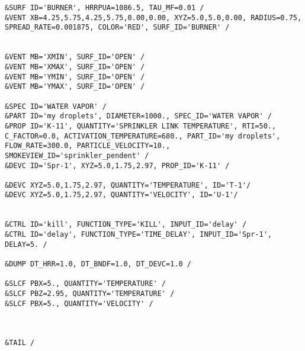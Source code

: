 \begin{lstlisting}[emptylines=0,basicstyle=\tiny]
&SURF ID='BURNER', HRRPUA=1086.5, TAU_MF=0.01 /
&VENT XB=4.25,5.75,4.25,5.75,0.00,0.00, XYZ=5.0,5.0,0.00, RADIUS=0.75, SPREAD_RATE=0.001875, COLOR='RED', SURF_ID='BURNER' /


&VENT MB='XMIN', SURF_ID='OPEN' /  
&VENT MB='XMAX', SURF_ID='OPEN' /  
&VENT MB='YMIN', SURF_ID='OPEN' /  
&VENT MB='YMAX', SURF_ID='OPEN' / 
 
&SPEC ID='WATER VAPOR' /
&PART ID='my droplets', DIAMETER=1000., SPEC_ID='WATER VAPOR' /
&PROP ID='K-11', QUANTITY='SPRINKLER LINK TEMPERATURE', RTI=50., C_FACTOR=0.0, ACTIVATION_TEMPERATURE=680., PART_ID='my droplets', FLOW_RATE=300.0, PARTICLE_VELOCITY=10., SMOKEVIEW_ID='sprinkler_pendent' /
&DEVC ID='Spr-1', XYZ=5.0,1.75,2.97, PROP_ID='K-11' /

&DEVC XYZ=5.0,1.75,2.97, QUANTITY='TEMPERATURE', ID='T-1'/
&DEVC XYZ=5.0,1.75,2.97, QUANTITY='VELOCITY', ID='U-1'/


&CTRL ID='kill', FUNCTION_TYPE='KILL', INPUT_ID='delay' /
&CTRL ID='delay', FUNCTION_TYPE='TIME_DELAY', INPUT_ID='Spr-1', DELAY=5. /

&DUMP DT_HRR=1.0, DT_BNDF=1.0, DT_DEVC=1.0 /

&SLCF PBX=5., QUANTITY='TEMPERATURE' /
&SLCF PBZ=2.95, QUANTITY='TEMPERATURE' /
&SLCF PBX=5., QUANTITY='VELOCITY' /



&TAIL /


\end{lstlisting}

